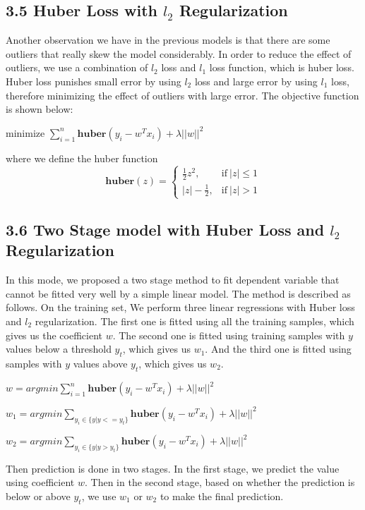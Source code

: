 \documentclass[9pt,twocolumn,twoside]{pnas-new}
\begin{document}
\subsection*{3.5 Huber Loss with $l_{2}$ Regularization}
Another observation we have in the previous models is that there are some outliers that really skew the model considerably. In order to reduce the effect of outliers, we use a combination of $l_{2}$ loss and $l_{1}$ loss function, which is huber loss. Huber loss punishes small error by using $l_{2}$ loss and large error by using $l_{1}$ loss, therefore minimizing the effect of outliers with large error. The objective function is shown below: \newline
\begin{center}
minimize $ \sum_{i=1}^{n}\textbf{huber}(y_{i} - w^{T}x_{i}) + \lambda||w||^{2} $ 
\end{center}
where we define the huber function
\begin{equation*}
  \textbf{huber}(z) =
  	\begin{cases}
    	\frac{1}{2}z^{2}, & \text{if}\  |z| \leq 1 \\
        |z| - \frac{1}{2}, & \text{if}\ |z| > 1 
    \end{cases}
\end{equation*}



\subsection*{3.6 Two Stage model with Huber Loss and $l_{2}$ Regularization}
In this mode, we proposed a two stage method to fit dependent variable that cannot be fitted very well by a simple linear model. The method is described as follows. On the training set, We perform three linear regressions with Huber loss and $l_{2}$ regularization. The first one is fitted using all the training samples, which gives us the coefficient $w$. The second one is fitted using training samples with $y$ values below a threshold $y_t$, which gives us $w_1$. And the third one is fitted using samples with $y$ values above $y_t$, which gives us $w_2$.\\
\begin{center}
$w = argmin \sum_{i=1}^{n}\textbf{huber}(y_{i} - w^{T}x_{i}) + \lambda||w||^{2}$

$w_1 = argmin \sum_{y_i\in \{y|y<=y_t\}} \textbf{huber}(y_{i} - w^{T}x_{i}) + \lambda||w||^{2} $

$w_2 = argmin \sum_{y_i\in \{y|y>y_t\}} \textbf{huber}(y_{i} - w^{T}x_{i}) + \lambda||w||^{2} $
\end{center}
Then prediction is done in two stages. In the first stage, we predict the value using coefficient $w$. Then in the second stage, based on whether the prediction is below or above $y_t$, we use $w_1$ or $w_2$ to make the final prediction.
\end{document}
